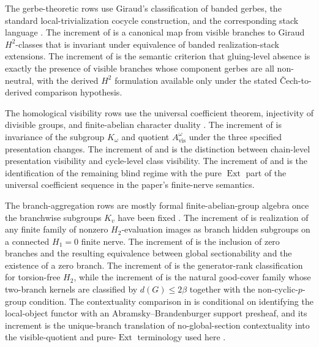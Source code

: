 The gerbe-theoretic rows use Giraud's classification of banded gerbes, the standard local-trivialization cocycle construction, and the corresponding stack language \cite{Giraud1971,Breen2006,Murray1996,Brylinski1993,StacksProject}. The increment of  is a canonical map from visible branches to Giraud $H^2$-classes that is invariant under equivalence of banded realization-stack extensions. The increment of  is the semantic criterion that gluing-level absence is exactly the presence of visible branches whose component gerbes are all non-neutral, with the derived $H^2$ formulation available only under the stated \v{C}ech-to-derived comparison hypothesis.

The homological visibility rows use the universal coefficient theorem, injectivity of divisible groups, and finite-abelian character duality \cite{Hatcher2002,Weibel1994,Terras1999,DummitFoote2004}. The increment of  is invariance of the subgroup $K_\omega$ and quotient $A_{\mathrm{vis}}^\omega$ under the three specified presentation changes. The increment of  and  is the distinction between chain-level presentation visibility and cycle-level class visibility. The increment of  and  is the identification of the remaining blind regime with the pure $\operatorname{Ext}$ part of the universal coefficient sequence in the paper's finite-nerve semantics.

The branch-aggregation rows are mostly formal finite-abelian-group algebra once the branchwise subgroups $K_v$ have been fixed \cite{Terras1999,DummitFoote2004}. The increment of  is realization of any finite family of nonzero $H_2$-evaluation images as branch hidden subgroups on a connected $H_1=0$ finite nerve. The increment of  is the inclusion of zero branches and the resulting equivalence between global sectionability and the existence of a zero branch. The increment of  is the generator-rank classification for torsion-free $H_2$, while the increment of  is the natural good-cover family whose two-branch kernels are classified by $d(G)\le 2\beta$ together with the non-cyclic-$p$-group condition. The contextuality comparison in  is conditional on identifying the local-object functor with an Abramsky--Brandenburger support presheaf, and its increment is the unique-branch translation of no-global-section contextuality into the visible-quotient and pure-$\operatorname{Ext}$ terminology used here \cite{AbramskyBrandenburger2011,AbramskyMansfieldSoaresBarbosa2012,AbramskyBarbosaKishidaLalMansfield2015,Caru2017,Caru2018,Montanhano2021}.

